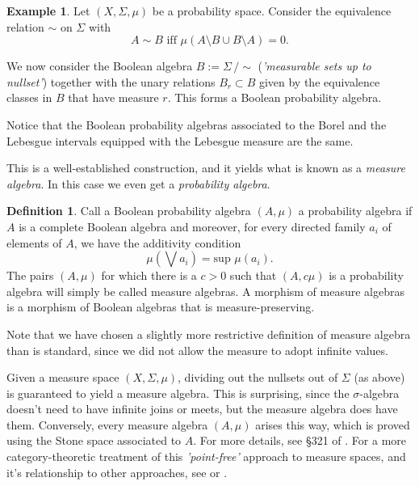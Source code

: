 \documentclass[a4paper]{amsproc}
\theoremstyle{plain}
\theoremstyle{definition}
\newtheorem{example}[theorem]{Example}
\newtheorem{definition}[theorem]{Definition}
\theoremstyle{remark}
\numberwithin{equation}{section}
\newcommand{\s}{\textsf{ }}
\begin{document}
\begin{example}\label{mod_nullset}
    Let $(X, \Sigma, \mu)$ be a probability space. Consider the equivalence relation $\sim$ on $\Sigma$ with
    \begin{equation*}
        A \sim B \text{ iff } \mu (A \setminus B \cup B \setminus A) = 0 .
    \end{equation*}

    We now consider the Boolean algebra $B := \Sigma \, / \sim$\s (\emph{'measurable sets up to nullset'}) together with the unary relations $B_r \subset B$ given by the equivalence classes in $B$ that have measure $r$. This forms a Boolean probability algebra.

    Notice that the Boolean probability algebras associated to the Borel and the Lebesgue intervals equipped with the Lebesgue measure are the same.
\end{example}

This is a well-established construction, and it yields what is known as a \emph{measure algebra}. In this case we even get a \emph{probability algebra}.

\begin{definition}\label{probability_alg}
    Call a Boolean probability algebra $(A,\mu)$ a probability algebra if $A$ is a complete Boolean algebra and moreover, for every directed family $a_i$ of elements of $A$, we have the additivity condition
    \[
    \mu(\bigvee a_i) = \text{sup } \mu(a_i) .
    \]
    The pairs $(A,\mu)$ for which there is a $c > 0$ such that $(A, c \mu)$ is a probability algebra will simply be called measure algebras. A morphism of measure algebras is a morphism of Boolean algebras that is measure-preserving.
\end{definition}

Note that we have chosen a slightly more restrictive definition of measure algebra than is standard, since we did not allow the measure to adopt infinite values.

Given a measure space $(X,\Sigma,\mu)$, dividing out the nullsets out of $\Sigma$ (as above) is guaranteed to yield a measure algebra. This is surprising, since the $\sigma$-algebra doesn't need to have infinite joins or meets, but the measure algebra does have them. Conversely, every measure algebra $(A,\mu)$ arises this way, which is proved using the Stone space associated to $A$. For more details, see \S 321 of \cite{fremlin2012measure}. For a more category-theoretic treatment of this \emph{'point-free'} approach to measure spaces, and it's relationship to other approaches, see \cite{pavlov2022gelfand} or \cite{jamneshan2020foundational}.
\end{document}
